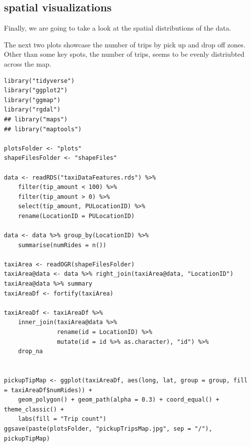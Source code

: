 \documentclass[11pt]{article}
\begin{document}
\subsection{spatial visualizations}
\label{sec:orgb8b93c5}

Finally, we are going to take a look at the spatial distributions of the data.

The next two plots showcase the number of trips by pick up and drop off zones.
Other than some key spots, the number of trips, seems to be evenly distriubted
across the map.

\begin{verbatim}
library("tidyverse")
library("ggplot2")
library("ggmap")
library("rgdal")
## library("maps")
## library("maptools")

plotsFolder <- "plots"
shapeFilesFolder <- "shapeFiles"

data <- readRDS("taxiDataFeatures.rds") %>%
    filter(tip_amount < 100) %>%
    filter(tip_amount > 0) %>%
    select(tip_amount, PULocationID) %>%
    rename(LocationID = PULocationID)

data <- data %>% group_by(LocationID) %>%
    summarise(numRides = n())

taxiArea <- readOGR(shapeFilesFolder)
taxiArea@data <- data %>% right_join(taxiArea@data, "LocationID")
taxiArea@data %>% summary
taxiAreaDf <- fortify(taxiArea)

taxiAreaDf <- taxiAreaDf %>%
    inner_join(taxiArea@data %>%
               rename(id = LocationID) %>%
               mutate(id = id %>% as.character), "id") %>%
    drop_na


pickupTipMap <- ggplot(taxiAreaDf, aes(long, lat, group = group, fill = taxiAreaDf$numRides)) +
    geom_polygon() + geom_path(alpha = 0.3) + coord_equal() + theme_classic() +
    labs(fill = "Trip count")
ggsave(paste(plotsFolder, "pickupTripsMap.jpg", sep = "/"), pickupTipMap)
\end{verbatim}
\end{document}
